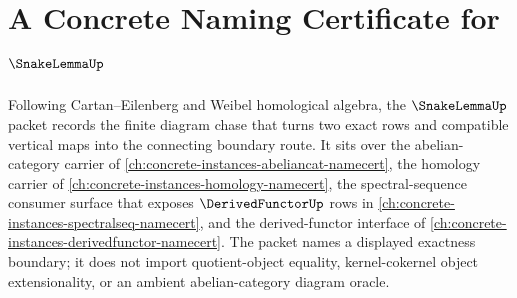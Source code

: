 \chapter{A Concrete Naming Certificate for $\SnakeLemmaUp$}
\label{ch:concrete-instances-snake-lemma-namecert}

Following Cartan--Eilenberg and Weibel homological algebra, the $\SnakeLemmaUp$ packet records the finite diagram chase that turns two exact rows and compatible vertical maps into the connecting boundary route. It sits over the abelian-category carrier of \autoref{ch:concrete-instances-abeliancat-namecert}, the homology carrier of \autoref{ch:concrete-instances-homology-namecert}, the spectral-sequence consumer surface that exposes $\DerivedFunctorUp$ rows in \autoref{ch:concrete-instances-spectralseq-namecert}, and the derived-functor interface of \autoref{ch:concrete-instances-derivedfunctor-namecert}. The packet names a displayed exactness boundary; it does not import quotient-object equality, kernel-cokernel object extensionality, or an ambient abelian-category diagram oracle.

